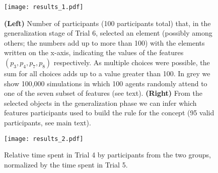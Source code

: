\begin{figure}
\begin{center}
	\texttt{[image: results\_1.pdf]}
\end{center}\caption{\textbf{(Left)} Number of participants (100 participants total) that, in the generalization stage of Trial 6, selected an element (possibly among others; the numbers add up to more than 100) with the elements written on the x-axis, indicating the values of the features $(p_3,p_4,p_7,p_8)$ respectively. As multiple choices were possible, the sum for all choices adds up to a value greater than 100. In grey we show 100,000 simulations in which 100 agents randomly attend to one of the seven subset of features (see text). \textbf{(Right)} From the selected objects in the generalization phase we can infer which features participants used to build the rule for the concept (95 valid participants, see main text).}
\label{fig:results1}
\end{figure}
 


 
 \begin{figure}
\begin{center}
	\texttt{[image: results\_2.pdf]}
\end{center}\caption{Relative time spent in Trial 4 by participants from the two groups, normalized by the time spent in Trial 5.}
\label{fig:results2}
\end{figure}




